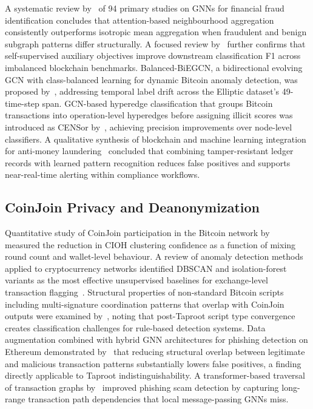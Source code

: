 \documentclass[12pt,a4paper]{article}
\begin{document}
A systematic review by~\citep{motie2024} of 94 primary
studies on GNNs for financial fraud identification concludes
that attention-based neighbourhood aggregation consistently
outperforms isotropic mean aggregation when fraudulent and
benign subgraph patterns differ structurally. A focused review
by~\citep{fan2024gnn} further confirms that self-supervised
auxiliary objectives improve downstream classification F1
across imbalanced blockchain benchmarks. Balanced-BiEGCN,
a bidirectional evolving GCN with class-balanced learning
for dynamic Bitcoin anomaly detection, was proposed
by~\citep{xiao2025}, addressing temporal label drift across
the Elliptic dataset's 49-time-step span. GCN-based hyperedge
classification that groups Bitcoin transactions into
operation-level hyperedges before assigning illicit scores
was introduced as CENSor by~\citep{lee2024}, achieving
precision improvements over node-level classifiers. A
qualitative synthesis of blockchain and machine learning
integration for anti-money laundering~\citep{lo2023}
concluded that combining tamper-resistant ledger records
with learned pattern recognition reduces false positives
and supports near-real-time alerting within compliance
workflows.

\subsection{CoinJoin Privacy and Deanonymization}

Quantitative study of CoinJoin participation in the Bitcoin
network by~\citep{coinjoin2024tdsc} measured the reduction
in CIOH clustering confidence as a function of mixing round
count and wallet-level behaviour. A review of anomaly
detection methods applied to cryptocurrency networks
identified DBSCAN and isolation-forest variants as the most
effective unsupervised baselines for exchange-level
transaction flagging~\citep{futureinternet2025}. Structural
properties of non-standard Bitcoin scripts including
multi-signature coordination patterns that overlap with
CoinJoin outputs were examined by~\citep{kiani2024}, noting
that post-Taproot script type convergence creates
classification challenges for rule-based detection systems.
Data augmentation combined with hybrid GNN architectures for
phishing detection on Ethereum demonstrated by~\citep{chen2024}
that reducing structural overlap between legitimate and
malicious transaction patterns substantially lowers false
positives, a finding directly applicable to Taproot
indistinguishability. A transformer-based traversal of
transaction graphs by~\citep{choi2024} improved phishing
scam detection by capturing long-range transaction path
dependencies that local message-passing GNNs miss.
\end{document}
